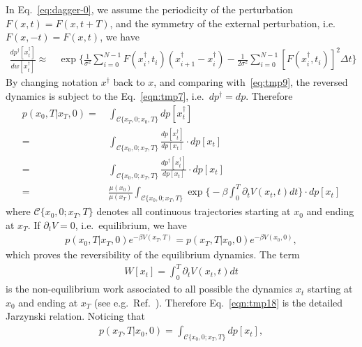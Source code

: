 \documentclass[aps, pre, preprint,unsortedaddress,a4paper,onecolumn]{revtex4-1}
\newcommand{\mc}[0]{\mathcal {C}}
\newcommand{\dt}[0]{\Delta t}
\begin{document}
In Eq.~\eqref{eq:dagger-0}, we assume the periodicity of the perturbation $F(x,t) = F(x,t+T)$, and the symmetry of the external perturbation, i.e.~$F(x, -t) = F(x, t)$, we have
\begin{align}
  \frac{dp^\dagger[x^\dagger_t]}{dw[x^\dagger_t]}  
  \approx\,&
  \exp\bigg\{
  \frac1{\sigma^2}\sum_{i=0}^{N-1} F(x^\dagger_{i},t_{i})(x^\dagger_{i+1} - x^\dagger_i) -
  \frac1{2\sigma^2}\sum_{i=0}^{N-1}[F(x^\dagger_i, t_i)]^2\dt\bigg\}  
\end{align}
By changing notation $x^\dagger$ back to $x$, and comparing with~\eqref{eq:tmp9}, the reversed dynamics is subject to the Eq.~\eqref{eqn:tmp7},
i.e.~$dp^\dagger = dp$.
Therefore
\begin{align}\nonumber
  p(x_0,T\vert x_T,0)
  =&\,\int_{\mc\{x_T,0;x_0,T\}}
  dp[x^\dagger_t] \\\nonumber  
  =&\,
  \int_{\mc\{x_0,0;x_T,T\}}
  \frac{  dp[x^\dagger_t] }{ dp[x_t]} \cdot dp[x_t] \\\nonumber
  =&\,
  \int_{\mc\{x_0,0;x_T,T\}}
  \frac{  dp^\dagger[x^\dagger_t] }{ dp[x_t]} \cdot dp[x_t] \\\label{eqn:tmp18}
  = &\,
  \frac{\mu(x_0)}{\mu(x_T)}
  \int_{\mc\{x_0,0;x_T,T\}}
  \exp\bigg\{
  -\beta\int_0^T \partial_t V(x_t,t)dt 
  \bigg\} \cdot dp[x_t]
\end{align}
where $\mc\{x_0,0;x_T,T\}$ denotes all continuous trajectories starting at $x_0$ and ending at $x_T$.
If $\partial_t V = 0$, i.e.~equilibrium, we have
\begin{align}
  p(x_0,T\vert x_T,0)e^{-\beta V(x_T,T)} =  p(x_T,T\vert x_0,0) e^{-\beta V(x_0,0)},
\end{align}
which proves the reversibility of the equilibrium dynamics.
The term
\begin{align}
  W[x_t] = \int_0^T \partial_t V(x_t,t)dt
\end{align}
is the non-equilibrium work associated to all possible
the dynamics $x_t$ starting at $x_0$ and ending at $x_T$ (see e.g.~Ref.~\cite{seifert2012stochastic}).
Therefore Eq.~\eqref{eqn:tmp18} is the detailed Jarzynski relation.
Noticing that
\begin{align}
  \label{eq:tmp21}
  p(x_T,T\vert x_0,0) = \int_{\mc\{x_0,0;x_T,T\}}dp[x_t],
\end{align}
\end{document}
